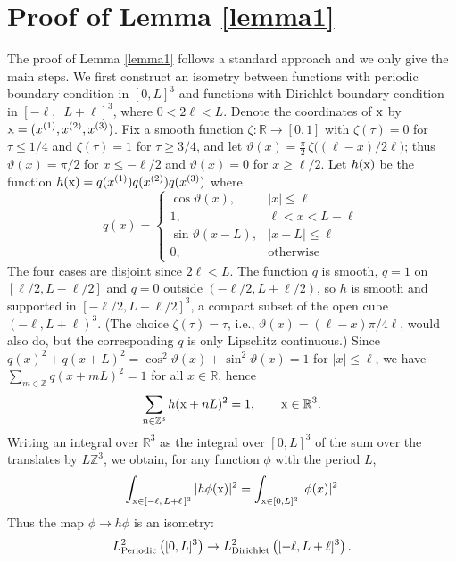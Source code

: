 \documentclass[11pt]{article}
\numberwithin{equation}{section}
\newcommand{\x}{{\rm x}}
\newcommand{\beq}{\begin{equation}}
\newcommand{\eeq}{\end{equation}}
\newcommand\Z{{\mathbb Z}}
\newcommand\R{{\mathbb R}}
\theoremstyle{definition}
\begin{document}
\section{Proof of Lemma \ref{lemma1}}
\label{sec:lemma22}



The proof of Lemma \ref{lemma1} follows a standard approach and we only give the main steps.
We first  construct an isometry between functions with periodic
boundary condition in $[0, L]^3$ and functions with Dirichlet boundary condition in $[-\ell,\,\,\,L+\ell]^3$, where $0<2\ell<L$.
Denote the coordinates of $\x$ by   $\x = (x^{(1)}, x^{(2)}, x^{(3)})$.
Fix a smooth function $\zeta:\R\to[0,1]$ with $\zeta(\tau)=0$ for $\tau\leq 1/4$ and $\zeta(\tau)=1$ for $\tau\geq 3/4$, and let
$\vartheta(x)=\frac{\pi}{2}\, \zeta\big((\ell-x)/2\ell\big)$; thus $\vartheta(x)=\pi/2$ for $x\leq -\ell/2$ and $\vartheta(x)=0$ for $x\geq \ell/2$.
Let  $h(\x)$ be the function $h(\x) = q(x^{(1)}) q(x^{(2)}) q(x^{(3)})$ where
\beq
q(x)=\left\{
\begin{array}{ll}
\cos\vartheta(x), & |x|\leq \ell\\
1, & \ell<x<L-\ell\\
\sin\vartheta(x-L), & |x-L|\leq \ell\\
0, & \text{otherwise}
\end{array}\right.
\eeq
The four cases are disjoint since $2\ell<L$. The function  $q$ is smooth, $q=1$ on $[\ell/2,L-\ell/2]$ and $q=0$ outside $(-\ell/2,L+\ell/2)$, so
$h$ is smooth and supported in $[-\ell/2,L+\ell/2]^3$, a compact subset of the open cube $(-\ell,L+\ell)^3$.
(The choice $\zeta(\tau)=\tau$, i.e., $\vartheta(x)=(\ell-x)\pi/4\ell$, would also do, but the corresponding $q$ is only Lipschitz continuous.)
Since $q(x)^2+q(x+L)^2=\cos^2\vartheta(x)+\sin^2\vartheta(x)=1$ for $|x|\leq\ell$, we have $\sum_{m\in\Z}q(x+mL)^2=1$ for all $x\in\R$, hence
\[
\sum_{n\in\Z^3}h(\x+nL)^2=1,\qquad \x\in\R^3 .
\]
Writing an integral over $\R^3$ as the integral over $[0,L]^3$ of the sum over the translates by $L\Z^3$, we obtain, for any  function $\phi$ with
the period   $L$,
\beq\label{proh1}
\int_{\x\in[-\ell,\,L+\ell\,]^3}|h \phi(\x)|^2=\int_{\x\in[0,L]^3}|\phi(x)|^2
\eeq
Thus the map $ \phi\longrightarrow h \phi$
is an isometry: $$
L^2_{
{\rm Periodic}}\left([0,L]^3\right)\to L^2_{
{\rm Dirichlet}}\left([-\ell,L+\ell]^3\right).$$
\end{document}
